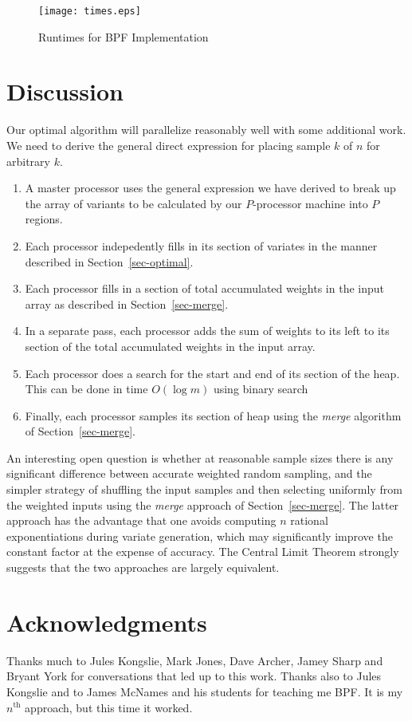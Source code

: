 \documentclass[12pt]{article}
\begin{document}
  \begin{figure}
    \centering
    \texttt{[image: times.eps]}
    \caption{Runtimes for BPF Implementation}\label{fig-times}
  \end{figure}

\section{Discussion}

  Our optimal algorithm will parallelize reasonably well
  with some additional work. We need to derive the general
  direct expression for placing sample $k$ of $n$ for
  arbitrary $k$.
  \begin{enumerate}
  \item A master processor uses the general expression
    we have derived to break up the array of variants
    to be calculated by our $P$-processor
    machine into $P$ regions.
  \item Each processor indepedently fills in its section
    of variates in the manner described in Section~\ref{sec-optimal}.
  \item Each processor fills in a section of total accumulated
    weights in the input array as described in
    Section~\ref{sec-merge}.
  \item In a separate pass, each processor adds the sum of
    weights to its left to its section of the total accumulated
    weights in the input array.
  \item Each processor does a search for the start and end
    of its section of the heap.  This can be done in time
    $O(\log m)$ using binary search
  \item Finally, each processor samples its section of heap
    using the {\em merge} algorithm of Section~\ref{sec-merge}.
  \end{enumerate}
  
  An interesting open question is whether at reasonable
  sample sizes there is any significant difference between
  accurate weighted random sampling, and the simpler
  strategy of shuffling the input samples and then selecting
  uniformly from the weighted inputs using the {\em merge}
  approach of Section~\ref{sec-merge}.  The latter approach
  has the advantage that one avoids computing $n$ rational
  exponentiations during variate generation, which may
  significantly improve the constant factor at the expense
  of accuracy.  The Central Limit Theorem strongly suggests
  that the two approaches are largely equivalent.

\section*{Acknowledgments}

  Thanks much to Jules Kongslie, Mark Jones, Dave Archer,
  Jamey Sharp and Bryant York for conversations that led up
  to this work.  Thanks also to Jules Kongslie and to James
  McNames and his students for teaching me BPF.  It is my
  $n^{\textrm{th}}$ approach, but this time it worked.
\end{document}
